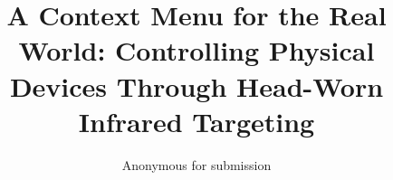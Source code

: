 \documentclass{sigchi}
\begin{document}
\title{A Context Menu for the Real World: Controlling Physical Devices Through Head-Worn Infrared Targeting}

\author{
  \alignauthor Anonymous for submission
}

\maketitle

\begin{abstract}

\end{abstract}















%
%
%
%
%
\balance




\end{document}
